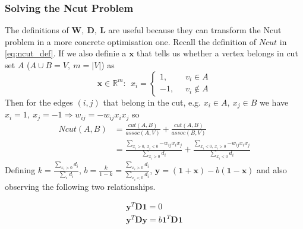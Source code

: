 \documentclass[a4paper]{article}
\begin{document}
\subsubsection{Solving the Ncut Problem}

The definitions of $\textbf{W},\ \textbf{D},\ \textbf{L}$ are useful because they can transform the Ncut problem in a more concrete optimisation one. Recall the definition of $Ncut$ in \eqref{eq:ncut_def}. If we also definie a  $\textbf{x}$ that tells us whether a vertex belongs in cut set $A$ ($A\cup B = V, \ m = \left|V \right|$) as
\begin{equation}
    \textbf{x} \in \mathbb{R}^m: \ \ x_{i} = 
    \left\{
\begin{array}{ll}
      1, \; \; &v_i \in A\\
      -1, \; \; &v_i \notin A
\end{array} 
\right. 
\end{equation}
Then for the edges $(i,j)$ that belong in the cut, e.g. $x_i\in A,\ x_j\in B$ we have $x_i=1, \ x_j=-1 \Rightarrow w_{ij} = - w_{ij}x_ix_j$ so
\begin{align}
    Ncut(A,B) &= \frac{cut(A,B)}{assoc(A,V)} + \frac{cut(A,B)}{assoc(B,V)} \nonumber \\
    &= \frac{\sum\limits_{{{x}_{i}}> 0,\ {{x}_{i}}< 0}{-{{w}_{ij}}{{x}_{i}}{{x}_{j}}}}{\sum\limits_{{{x}_{i}}> 0}{{{d}_{i}}}}
    +
    \frac{\sum\limits_{{{x}_{i}}< 0,\ {{x}_{i}}> 0}{-{{w}_{ij}}{{x}_{i}}{{x}_{j}}}}{\sum\limits_{{{x}_{i}}< 0}{{{d}_{i}}}}
\end{align}
Defining $k=\tfrac{\sum\limits_{{{x}_{i}}> 0}{{{d}_{i}}}}{\sum\limits_{{{i}_{}}}{{{d}_{i}}}}$, $b=\tfrac{k}{1-k}=\tfrac{\sum\limits_{{{x}_{i}}> 0}{{{d}_{i}}}}{\sum\limits_{{{x}_{i}<0}}{{{d}_{i}}}}$, $\textbf{y}=(\textbf{1}+\textbf{x}) -b(\textbf{1}-\textbf{x})$ %
\TODO[ref] and also observing \TODO[ref] the following two relationships.

\begin{align}
\textbf{y}^T\textbf{D1}=0\tag{1} \\
\textbf{y}^T\textbf{Dy}=b\textbf{1}^T\textbf{D1} \tag{2}
\end{align}
\end{document}

